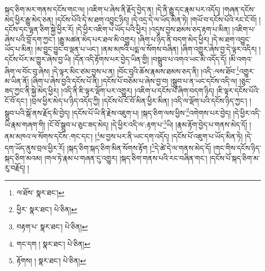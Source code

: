 སྐད་ཅིག་མར་གནས་དངོས་གང་ལ། །འཇིག་པ་ཞེས་ནི་རྗོད་བྱེད་ན། །དེ་ནི་རྒྱུ་དང་རྣམ་པར་འདོད། །གཞན་དངོས་མེད་ཕྱིར་རྒྱུ་མེད་ཅན། །དངོས་པོའི་དེ་མ་ཐག་འབྱུང་ཉིད། །དེ་འདྲ་དེ་ལ་ཡོད་མིན་ཏེ། །གཡོ་བ་དངོས་པོའི་རང་ངོ་བོ། །དངོས་དང་ལྷན་ཅིག་སྐྱེ་ཕྱིར་རོ། །དེ་ཕྱིར་འཇིག་པ་ཡོད་པའི་ཕྱིར། །འདུས་བྱས་ཐམས་ཅད་རྟག་པ་མིན། །འཇིག་པ་ཞེས་པའི་བློ་དག་ཀྱང་། །རྒྱུ་མཚན་མེད་པར་ཐལ་མི་འགྱུར། །ཞིག་པ་ཉིད་ནི་བདག་མེད་ཕྱིར། །དེ་མ་ཐག་འབྱུང་ཡོད་པ་མིན། །མ་བྱུང་བྱུང་བ་ལྡན་པ་ཡང་། །ནམ་མཁའི་པདྨ་ལ་སོགས་བཞིན། །ཞིག་འགྱུར་ཞེས་བྱ་དེ་ལྟར་འདིར། །དངོས་པོར་མ་གྱུར་ཞེས་བྱ་ཡི། །དོན་འདི་རྟོགས་པར་བྱེད་ཡིན་གྱི། །བསྒྲུབ་པ་འགའ་ཡང་མི་འདོད་དོ། །མི་འགའ་ཞིག་ལ་བོང་བུ་ཞེས། །དེ་ལྟར་མིང་ཙམ་བྱས་པ་ན། །བོང་བུའི་ཆོས་རྣམས་ཐམས་ཅད་ནི། །འདི་:ལས་ཐོབ་\footnote{ལ་ཐོས་  སྣར་ཐང་། }འགྱུར་མ་ཡིན་ནོ། །ཞིག་པ་ཞེས་བྱའི་དངོས་པོ་ནི། །དངོས་པོ་བཅོམ་པ་ཞེས་བྱ་བ། །སྒྲུབ་པ་ན་ཡང་དངོས་འདི་ལ། །ཅུང་ཟད་ཀྱང་ནི་སྐྱེ་མེད་ཕྱིར། །འདི་ནི་ཇི་ལྟར་ལྡོག་པར་འགྱུར། །འཇིག་པ་དངོས་པོ་ཞིག་བདག་ཉིད། །ཇི་ལྟར་དངོས་པོའི་ངོ་བོ་དང་། །བྲལ་ཕྱིར་མེད་པ་ཉིད་འདོད་ཀྱི། །དངོས་པོ་ངོ་བོ་མིན་ཕྱིར་མིན། །འདི་ལ་ལྡོག་པའི་དངོས་ཉིད་ཀྱང་། །སྒྲུབ་པའི་སྒོ་ནས་རྗོད་མི་བྱེད། །དངོས་པོ་ཡི་ནི་རྗེས་འཇུག་པ། །སྐད་ཅིག་ལས་ཕྱིས་\footnote{ཕྱིར་  སྣར་ཐང་།  པེ་ཅིན། }འགེགས་པར་བྱེད། །དེ་ཕྱིར་འདི་ཡི་རྣམ་གཞག་གི། །ངོ་བོ་སྒྲུབ་པ་ཅུང་ཟད་མེད། །དེ་ཕྱིར་འདི་ལ་:རྟག་པ་\footnote{བརྟག་པ་  སྣར་ཐང་།  པེ་ཅིན། }ཡི། །རྣམ་རྟོག་བྱེད་པ་གནས་མེད་དོ། །ནམ་མཁའ་ལ་སོགས་དངོས་:གང་དང་། །\footnote{གང་དག །  སྣར་ཐང་།  པེ་ཅིན། }མ་བྱས་པར་ནི་ཡང་དག་འདོད། །དངོས་པོ་འཇུག་པ་ཡོད་མིན་ཏེ། །དེ་དག་ཡོད་ནུས་བྲལ་ཕྱིར་རོ། །སྐད་ཅིག་སྐད་ཅིག་མིན་སོགས་རྟོག །\footnote{རྟོགས། །  སྣར་ཐང་།  པེ་ཅིན། }དེ་ཚེ་དེ་ལ་གནས་མེད་དོ། །གང་གིས་དངོས་ཉིད་སྐད་ཅིག་མའམ། །གལ་ཏེ་རྣམ་པ་གཞན་དུ་འགྱུར། །སྐད་ཅིག་གནས་པའི་རང་བཞིན་གང་། །དངོས་པོ་སྐད་ཅིག་མ་རུ་བརྗོད། །
